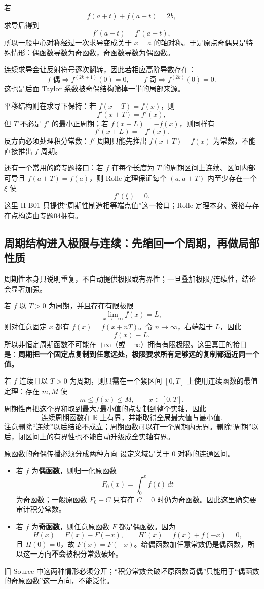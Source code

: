 \documentclass[11pt,a4paper]{ctexart}
\begin{document}
若
\[
f(a+t)+f(a-t)=2b,
\]
求导后得到
\[
\boxed{f'(a+t)=f'(a-t)},
\]
所以一般中心对称经过一次求导变成关于 $x=a$ 的轴对称。于是原点奇偶只是特殊情形：偶函数导数为奇函数，奇函数导数为偶函数。

\begin{center}

\end{center}

连续求导会让反射符号逐次翻转，因此若相应高阶导数存在：
\[
f\text{ 偶}\Longrightarrow f^{(2k+1)}(0)=0,
\qquad
f\text{ 奇}\Longrightarrow f^{(2k)}(0)=0.
\]
这也是后面 Taylor 系数被奇偶结构筛掉一半的局部来源。

平移结构则在求导下保持：若 $f(x+T)=f(x)$，则
\[
f'(x+T)=f'(x),
\]
但 $T$ 不必是 $f'$ 的最小正周期；若 $f(x+L)=-f(x)$，则同样有
\[
f'(x+L)=-f'(x).
\]
反方向必须处理积分常数：$f'$ 周期只能先推出 $f(x+T)-f(x)$ 为常数，不能直接推出 $f$ 周期。

还有一个常用的跨专题接口：若 $f$ 在每个长度为 $T$ 的周期区间上连续、区间内部可导且 $f(a+T)=f(a)$，则 Rolle 定理保证每个 $(a,a+T)$ 内至少存在一个 $\xi$ 使
\[
f'(\xi)=0.
\]
这里 H-B01 只提供“周期性制造相等端点值”这一接口；Rolle 定理本身、资格与存在点构造由专题04拥有。

\subsection{周期结构进入极限与连续：先缩回一个周期，再做局部性质}
周期性本身只说明重复，不自动提供极限或有界性；一旦叠加极限/连续性，结论会显著加强。

若 $f$ 以 $T>0$ 为周期，并且存在有限极限
\[
\lim_{x\to+\infty}f(x)=L,
\]
则对任意固定 $x$ 都有 $f(x)=f(x+nT)$。令 $n\to\infty$，右端趋于 $L$，因此
\[
\boxed{f(x)\equiv L}.
\]
所以非恒定周期函数不可能在 $+\infty$（或 $-\infty$）拥有有限极限。这里真正的接口是：\textbf{周期把一个固定点复制到任意远处，极限要求所有足够远的复制都逼近同一个值。}

若 $f$ 连续且以 $T>0$ 为周期，则只需在一个紧区间 $[0,T]$ 上使用连续函数的最值定理：存在 $m,M$ 使
\[
m\le f(x)\le M,\qquad x\in[0,T].
\]
周期性再把这个界和取到最大/最小值的点复制到整个实轴，因此
\[
\boxed{\text{连续周期函数在 }\mathbb R\text{ 上有界，并能取得全局最大值与最小值}.}
\]
注意删除“连续”以后结论不成立；周期函数可以在一个周期内无界。删除“周期”以后，闭区间上的有界性也不能自动升级成全实轴有界。

\begin{corebox}{原函数的奇偶传播必须分成两种方向}
设定义域是关于 $0$ 对称的连通区间。
\begin{itemize}
  \item 若 $f$ 为\textbf{偶函数}，则归一化原函数
  \[
  F_0(x)=\int_0^x f(t)\,dt
  \]
  为奇函数；一般原函数 $F_0+C$ 只有在 $C=0$ 时仍为奇函数。因此这里确实要审计积分常数。
  \item 若 $f$ 为\textbf{奇函数}，则任意原函数 $F$ 都是偶函数。因为
  \[
  H(x)=F(x)-F(-x),\qquad H'(x)=f(x)+f(-x)=0,
  \]
  且 $H(0)=0$，故 $F(x)=F(-x)$。给偶函数加任意常数仍是偶函数，所以这一方向\textbf{不会}被积分常数破坏。
\end{itemize}
旧 Source 中这两种情形必须分开；“积分常数会破坏原函数奇偶”只能用于“偶函数的奇原函数”这一方向，不能泛化。
\end{corebox}
\end{document}
